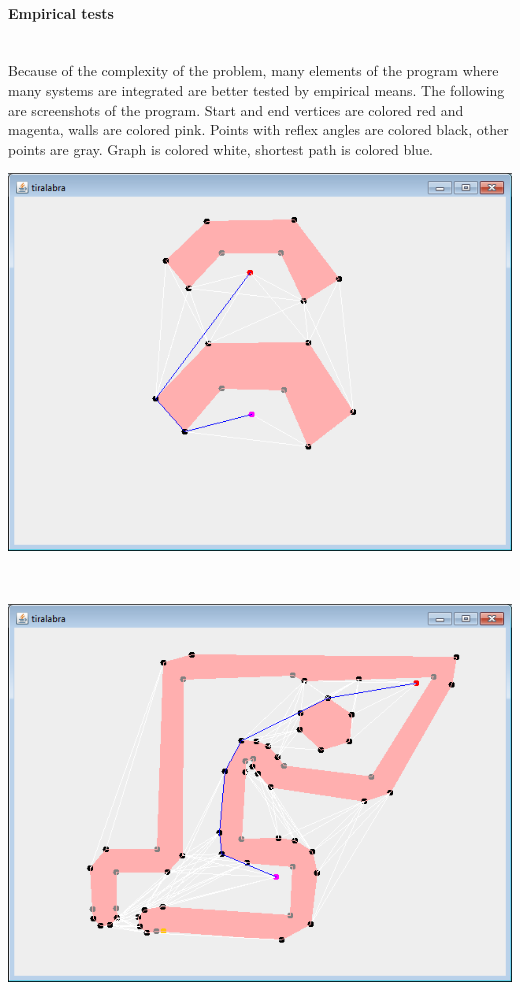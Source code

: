 \documentclass[a4paper,12pt]{article}
\begin{document}
\paragraph{\large Empirical tests} \hspace{0pt} \\
Because of the complexity of the problem, many elements of the program where many systems are integrated are better tested by empirical means. The following are screenshots of the program. Start and end vertices are colored red and magenta, walls are colored pink. Points with reflex angles are colored black, other points are gray. Graph is colored white, shortest path is colored blue.\\
\centerline{\includegraphics[scale=0.75]{example01.png}} \hspace*{\fill} \\
\centerline{\includegraphics[scale=0.75]{example02.png}} \hspace*{\fill} \\
\end{document}
